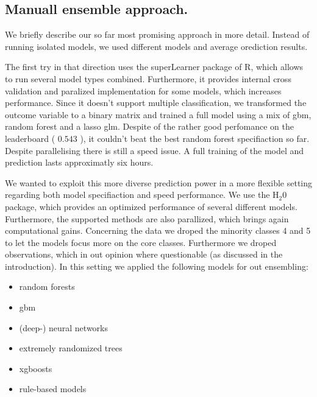 \documentclass[fleqn]{article}
\begin{document}
\subsection{Manuall ensemble approach. }

We briefly describe our so far most promising approach in more detail. Instead of running isolated models, we used different models and average orediction results. 

The first try in that direction uses the superLearner package of R, which allows to run several model types combined. Furthermore, it provides internal cross validation and paralized implementation for some models, which increases performance. Since it doesn't support multiple classification, we transformed the outcome variable to a binary matrix and trained a full model using a mix of gbm, random forest and a lasso glm. Despite of the rather good perfomance on the leaderboard ( $0.543$ ), it couldn't beat the best random forest specifiaction so far. Despite parallelising there is still a speed issue. A full training of the model and prediction lasts approximatly six hours. 

We wanted to exploit this more diverse prediction power in a more flexible setting regarding both model specifiaction and speed performance. We use the H$_2$0 package, which provides an optimized performance of several different models. Furthermore, the supported methods are also parallized, which brings again computational gains. Concerning the data we droped the minority classes 4 and 5 to let the models focus more on the core classes. Furthermore we droped observations, which in out opinion where questionable (as discussed in the introduction). In this setting we applied the following models for out ensembling: 

\begin{itemize}
	\item random forests
	\item gbm
	\item (deep-) neural networks
	\item extremely randomized trees
	\item xgboosts
	\item rule-based models
\end{itemize}
\end{document}
